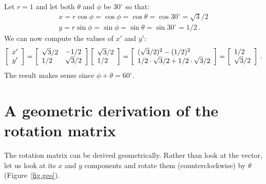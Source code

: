 \documentclass[11pt,a4paper]{report}
\begin{document}
Let $r=1$ and let both $\theta$ and $\phi$ be $30^\circ$ so that:
\[
\begin{array}{l}
x=r\cos\phi = \cos \phi = \cos \theta = \cos 30^\circ = \sqrt{3}/2\\
y=r\sin\phi = \sin \phi = \sin \theta = \sin 30^\circ = 1/2\,.
\end{array}
\]
We can now compute the values of $x'$ and $y'$:
\begin{displaymath}
\left[ 
\begin{array}{c} x'\\ y' \end{array}
\right] = 
\left[\begin{array}{l} \sqrt{3}/2 \\ 1/2 \end{array}\\
\begin{array}{l} -1/2 \\ \sqrt{3}/2 \end{array}\\
\right]
\left[\begin{array}{l} \sqrt{3}/2 \\ 1/2 \end{array}\\ \right] =
\left[\begin{array}{l} (\sqrt{3}/2)^2 - (1/2)^2 \\ 1/2\cdot \sqrt{3}/2+1/2\cdot \sqrt{3}/2 \end{array}\\ \right] =
\left[\begin{array}{l} 1/2 \\ \sqrt{3}/2 \end{array}\\ \right]\,.
\end{displaymath}
The result makes sense since $\phi+\theta=60^\circ$.


\section{A geometric derivation of the rotation matrix}

The rotation matrix can be derived geometrically. Rather than look at the vector, let us look at its $x$ and $y$ components and rotate them (counterclockwise) by $\theta$ (Figure~\ref{fig.geo}).
\end{document}
